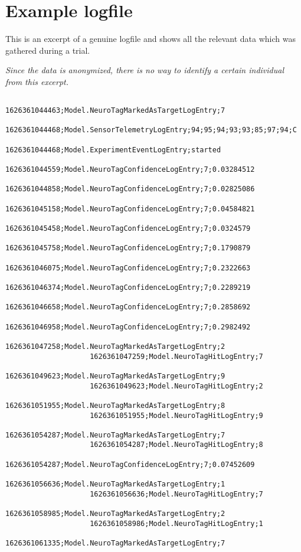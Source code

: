             \section{Example logfile}\label{logfile}                

                This is an excerpt of a genuine logfile and shows all the relevant data which was gathered during a trial. 
                
                \medskip

                \textit{Since the data is anonymized, there is no way to identify a certain individual from this excerpt.}

                \begin{lstlisting}
                    1626361044463;Model.NeuroTagMarkedAsTargetLogEntry;7
                    1626361044468;Model.SensorTelemetryLogEntry;94;95;94;93;93;85;97;94;C
                    1626361044468;Model.ExperimentEventLogEntry;started
                    1626361044559;Model.NeuroTagConfidenceLogEntry;7;0.03284512
                    1626361044858;Model.NeuroTagConfidenceLogEntry;7;0.02825086
                    1626361045158;Model.NeuroTagConfidenceLogEntry;7;0.04584821
                    1626361045458;Model.NeuroTagConfidenceLogEntry;7;0.0324579
                    1626361045758;Model.NeuroTagConfidenceLogEntry;7;0.1790879
                    1626361046075;Model.NeuroTagConfidenceLogEntry;7;0.2322663
                    1626361046374;Model.NeuroTagConfidenceLogEntry;7;0.2289219
                    1626361046658;Model.NeuroTagConfidenceLogEntry;7;0.2858692
                    1626361046958;Model.NeuroTagConfidenceLogEntry;7;0.2982492
                    1626361047258;Model.NeuroTagMarkedAsTargetLogEntry;2
                    1626361047259;Model.NeuroTagHitLogEntry;7
                    1626361049623;Model.NeuroTagMarkedAsTargetLogEntry;9
                    1626361049623;Model.NeuroTagHitLogEntry;2
                    1626361051955;Model.NeuroTagMarkedAsTargetLogEntry;8
                    1626361051955;Model.NeuroTagHitLogEntry;9
                    1626361054287;Model.NeuroTagMarkedAsTargetLogEntry;7
                    1626361054287;Model.NeuroTagHitLogEntry;8
                    1626361054287;Model.NeuroTagConfidenceLogEntry;7;0.07452609
                    1626361056636;Model.NeuroTagMarkedAsTargetLogEntry;1
                    1626361056636;Model.NeuroTagHitLogEntry;7
                    1626361058985;Model.NeuroTagMarkedAsTargetLogEntry;2
                    1626361058986;Model.NeuroTagHitLogEntry;1
                    1626361061335;Model.NeuroTagMarkedAsTargetLogEntry;7

\end{lstlisting}
